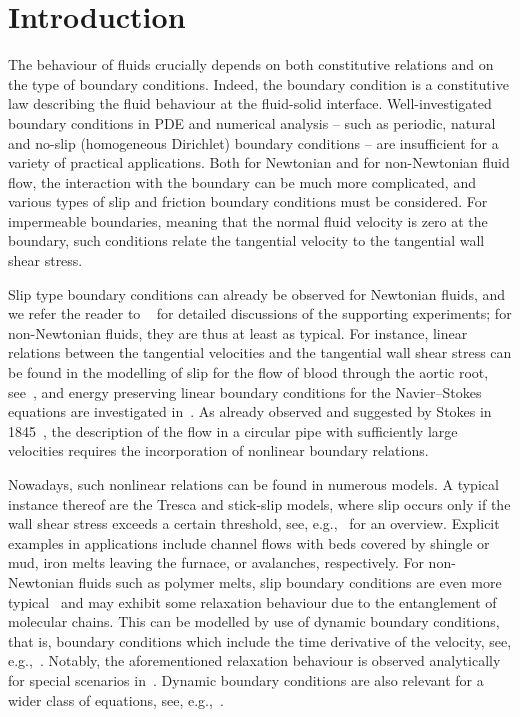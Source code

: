 \documentclass[reqno,a4paper]{amsart}
\begin{document}
	\tableofcontents
	
	\section{Introduction}
	
	The behaviour of fluids crucially depends on both constitutive relations and on the type of boundary conditions. {Indeed, the boundary condition is a constitutive law describing the fluid behaviour at the fluid-solid interface.}  
	Well-investigated boundary conditions in PDE and numerical analysis -- such as periodic, natural and no-slip (homogeneous Dirichlet) boundary conditions -- are insufficient for a variety of practical applications. 
	Both for Newtonian and for non-Newtonian fluid flow, the interaction with the boundary can be much more complicated, and various types of slip and friction boundary conditions must be considered. 
	For impermeable boundaries, meaning that  the normal fluid velocity is zero at the boundary, such conditions relate the tangential velocity to the tangential wall shear stress. 
	
	Slip type boundary conditions can already be observed for Newtonian fluids, and we refer the reader to ~\cite{NEBBC.2005,MalekRajagopal2023} for detailed discussions of the supporting experiments; for non-Newtonian fluids, they are thus at least as typical. 
	For instance, linear relations between the tangential velocities and the tangential wall shear stress can be found in the modelling of slip for the flow of blood through the aortic root, see~\cite{Chabiniok2022}, and energy preserving linear boundary conditions for the Navier--Stokes equations are investigated in~\cite{BotheKoehnePruess2013}. 
	As already observed and suggested by Stokes in 1845~\cite{Stokes1845}, the description of the flow in a circular pipe with  {sufficiently large} velocities  requires the incorporation of nonlinear boundary relations. 
	
	Nowadays, such nonlinear relations can be found in numerous models. 
	A typical instance thereof are the Tresca and stick-slip models, where slip occurs only if the wall shear stress exceeds a certain threshold, see, e.g.,~\cite{Denn2004} for an overview.  {Explicit examples in applications include channel flows with beds covered by shingle or mud, iron melts leaving the furnace, or avalanches, respectively.} For non-Newtonian fluids such as polymer melts, slip boundary conditions are even more typical~\cite{Hervet2003} and may  exhibit some relaxation behaviour due to the entanglement of molecular chains. 
	This can be modelled by use of dynamic boundary conditions, that is, boundary conditions which include the time derivative of the velocity, see, e.g.,~\cite{Hervet2003,Hatzikiriakos2012}. Notably, the aforementioned relaxation behaviour is observed analytically for special scenarios in~\cite{Abbatiello2021}. Dynamic boundary conditions are also relevant for a wider class of equations, see, e.g.,~\cite{BotheKashiwabaraKoehne2017,DenkPlossRauEtAl2023}.
	
\end{document}
